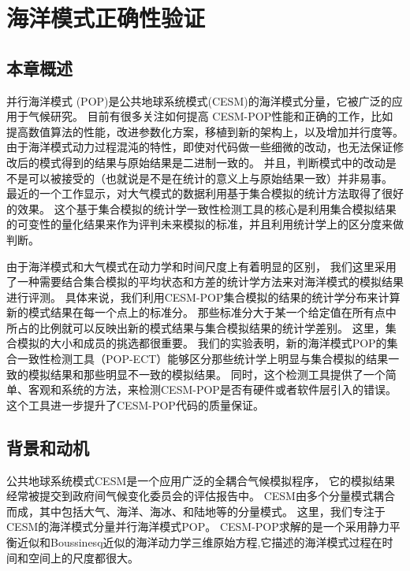 \chapter{海洋模式正确性验证}
\label{cha:verify}

\section{本章概述}
\label{verify:intro}
并行海洋模式 (POP)是公共地球系统模式(CESM)的海洋模式分量，它被广泛的应用于气候研究。 
目前有很多关注如何提高  CESM-POP性能和正确的工作，比如提高数值算法的性能，改进参数化方案，移植到新的架构上，以及增加并行度等。 
由于海洋模式动力过程混沌的特性，即使对代码做一些细微的改动，也无法保证修改后的模式得到的结果与原始结果是二进制一致的。 
并且，判断模式中的改动是不是可以被接受的（也就说是不是在统计的意义上与原始结果一致）并非易事。 
最近的一个工作显示，对大气模式的数据利用基于集合模拟的统计方法取得了很好的效果。
这个基于集合模拟的统计学一致性检测工具的核心是利用集合模拟结果的可变性的量化结果来作为评判未来模拟的标准，并且利用统计学上的区分度来做判断。 

由于海洋模式和大气模式在动力学和时间尺度上有着明显的区别， 我们这里采用了一种需要结合集合模拟的平均状态和方差的统计学方法来对海洋模式的模拟结果进行评测。 
具体来说，我们利用CESM-POP集合模拟的结果的统计学分布来计算新的模式结果在每一个点上的标准分。 
那些标准分大于某一个给定值在所有点中所占的比例就可以反映出新的模式结果与集合模拟结果的统计学差别。 
这里，集合模拟的大小和成员的挑选都很重要。
我们的实验表明，新的海洋模式POP的集合一致性检测工具（POP-ECT）能够区分那些统计学上明显与集合模拟的结果一致的模拟结果和那些明显不一致的模拟结果。 
同时，这个检测工具提供了一个简单、客观和系统的方法，来检测CESM-POP是否有硬件或者软件层引入的错误。
这个工具进一步提升了CESM-POP代码的质量保证。 



\section{背景和动机}
\label{verify:Backgroud}
公共地球系统模式CESM是一个应用广泛的全耦合气候模拟程序\cite{hurrell2013community}， 它的模拟结果经常被提交到政府间气候变化委员会的评估报告中\cite{stocker2013ipcc}。
CESM由多个分量模式耦合而成，其中包括大气、海洋、海冰、和陆地等的分量模式。 
这里，我们专注于CESM的海洋模式分量并行海洋模式POP。  
CESM-POP求解的是一个采用静力平衡近似和Boussinesq近似的海洋动力学三维原始方程,它描述的海洋模式过程在时间和空间上的尺度都很大。  

 
 
